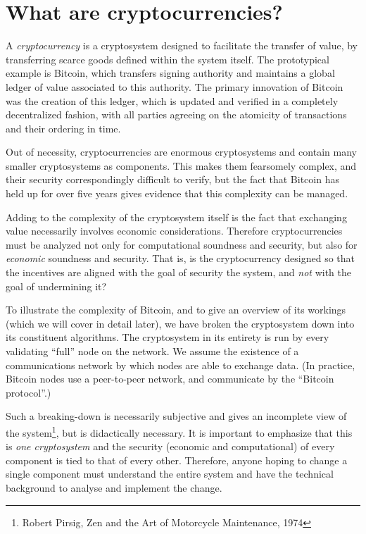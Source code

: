 \documentclass[letterpaper]{article}
\begin{document}
\section{What are cryptocurrencies?}

A \emph{cryptocurrency} is a cryptosystem designed to facilitate the transfer
of value, by transferring scarce goods defined within the system itself. The
prototypical example is Bitcoin, which transfers signing authority and maintains
a global ledger of value associated to this authority. The primary innovation
of Bitcoin was the creation of this ledger, which is updated and verified in
a completely decentralized fashion, with all parties agreeing on the atomicity
of transactions and their ordering in time.

Out of necessity, cryptocurrencies are enormous cryptosystems and contain many
smaller cryptosystems as components. This makes them fearsomely complex, and
their security correspondingly difficult to verify, but the fact that Bitcoin
has held up for over five years gives evidence that this complexity can be
managed.

Adding to the complexity of the cryptosystem itself is the fact that exchanging
value necessarily involves economic considerations. Therefore cryptocurrencies
must be analyzed not only for computational soundness and security, but also
for \emph{economic} soundness and security. That is, is the cryptocurrency
designed so that the incentives are aligned with the goal of security the system,
and \emph{not} with the goal of undermining it?

To illustrate the complexity of Bitcoin, and to give an overview of its
workings (which we will cover in detail later), we have broken the cryptosystem
down into its constituent algorithms. The cryptosystem in its entirety is
run by every validating ``full'' node on the network. We assume the existence
of a communications network by which nodes are able to exchange data. (In
practice, Bitcoin nodes use a peer-to-peer network, and communicate by the
``Bitcoin protocol''.)

Such a breaking-down is necessarily subjective and gives an incomplete view
of the system\footnote{Robert Pirsig, Zen and the Art of Motorcycle Maintenance,
1974}, but is didactically necessary.
It is important to emphasize that this is \emph{one cryptosystem} and the
security (economic and computational) of every component is tied to that
of every other. Therefore, anyone hoping to change a single component must
understand the entire system and have the technical background to analyse
and implement the change.
\end{document}
